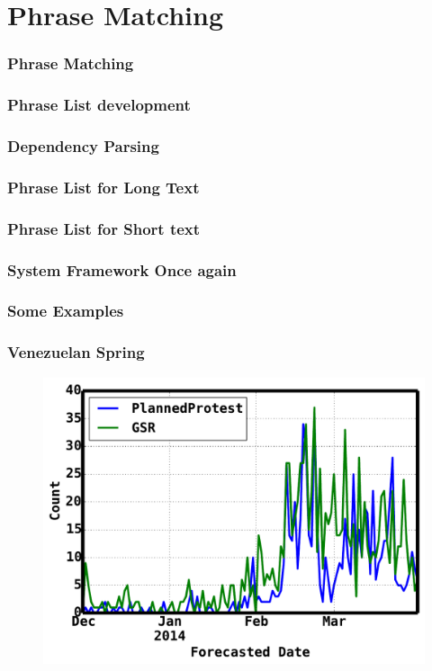 \documentclass{beamer}
\begin{document}
\section{Phrase Matching}
\begin{frame}
\frametitle{Phrase Matching}
\end{frame}


\begin{frame}
\frametitle{Phrase List development}
\end{frame}


\begin{frame}
    \frametitle{Dependency Parsing}
\end{frame}


\begin{frame}
    \frametitle{Phrase List for Long Text}
\end{frame}


\begin{frame}
    \frametitle{Phrase List for Short text}
\end{frame}


\begin{frame}
    \frametitle{System Framework Once again}
\end{frame}

\begin{frame}
    \frametitle{Some Examples}
\end{frame}

\begin{frame}
     \frametitle{Venezuelan Spring}
     \begin{figure}
        \centering
        \includegraphics[width=\textwidth,height=0.8\textheight]{venezuela}
     \end{figure}
\end{frame}
\end{document}
